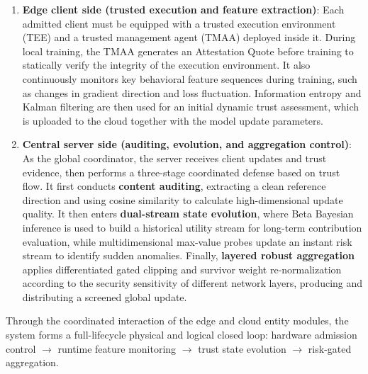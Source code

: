 \documentclass[final,5p,times,twocolumn]{elsarticle/elsarticle}
\begin{document}
\begin{enumerate}
    \item \textbf{Edge client side (trusted execution and feature extraction)}: Each admitted client must be equipped with a trusted execution environment (TEE) and a trusted management agent (TMAA) deployed inside it. During local training, the TMAA generates an Attestation Quote before training to statically verify the integrity of the execution environment. It also continuously monitors key behavioral feature sequences during training, such as changes in gradient direction and loss fluctuation. Information entropy and Kalman filtering are then used for an initial dynamic trust assessment, which is uploaded to the cloud together with the model update parameters.

    \item \textbf{Central server side (auditing, evolution, and aggregation control)}: As the global coordinator, the server receives client updates and trust evidence, then performs a three-stage coordinated defense based on trust flow. It first conducts \textbf{content auditing}, extracting a clean reference direction and using cosine similarity to calculate high-dimensional update quality. It then enters \textbf{dual-stream state evolution}, where Beta Bayesian inference is used to build a historical utility stream for long-term contribution evaluation, while multidimensional max-value probes update an instant risk stream to identify sudden anomalies. Finally, \textbf{layered robust aggregation} applies differentiated gated clipping and survivor weight re-normalization according to the security sensitivity of different network layers, producing and distributing a screened global update.
\end{enumerate}

Through the coordinated interaction of the edge and cloud entity modules, the system forms a full-lifecycle physical and logical closed loop: hardware admission control $\to$ runtime feature monitoring $\to$ trust state evolution $\to$ risk-gated aggregation.
\end{document}
